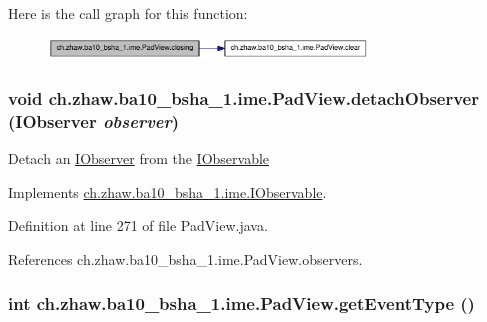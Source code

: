 Here is the call graph for this function:\nopagebreak
\begin{figure}[H]
\begin{center}
\leavevmode
\includegraphics[width=241pt]{classch_1_1zhaw_1_1ba10__bsha__1_1_1ime_1_1PadView_a4e5d62bdc50d1efae84f0cde40beeb51_cgraph}
\end{center}
\end{figure}
\hypertarget{classch_1_1zhaw_1_1ba10__bsha__1_1_1ime_1_1PadView_a1a924fadb8d0d1e9278a1ad136bcfb13}{
\subsubsection[{detachObserver}]{\setlength{\rightskip}{0pt plus 5cm}void ch.zhaw.ba10\_\-bsha\_\-1.ime.PadView.detachObserver ({\bf IObserver} {\em observer})}}
\label{classch_1_1zhaw_1_1ba10__bsha__1_1_1ime_1_1PadView_a1a924fadb8d0d1e9278a1ad136bcfb13}
Detach an \hyperlink{interfacech_1_1zhaw_1_1ba10__bsha__1_1_1ime_1_1IObserver}{IObserver} from the \hyperlink{interfacech_1_1zhaw_1_1ba10__bsha__1_1_1ime_1_1IObservable}{IObservable} 

Implements \hyperlink{interfacech_1_1zhaw_1_1ba10__bsha__1_1_1ime_1_1IObservable_a18a068196edc176c68282162bab22eff}{ch.zhaw.ba10\_\-bsha\_\-1.ime.IObservable}.

Definition at line 271 of file PadView.java.

References ch.zhaw.ba10\_\-bsha\_\-1.ime.PadView.observers.\hypertarget{classch_1_1zhaw_1_1ba10__bsha__1_1_1ime_1_1PadView_acea9e02a6fe22cd86a909dcd20de83f0}{
\subsubsection[{getEventType}]{\setlength{\rightskip}{0pt plus 5cm}int ch.zhaw.ba10\_\-bsha\_\-1.ime.PadView.getEventType ()}}
\label{classch_1_1zhaw_1_1ba10__bsha__1_1_1ime_1_1PadView_acea9e02a6fe22cd86a909dcd20de83f0}


